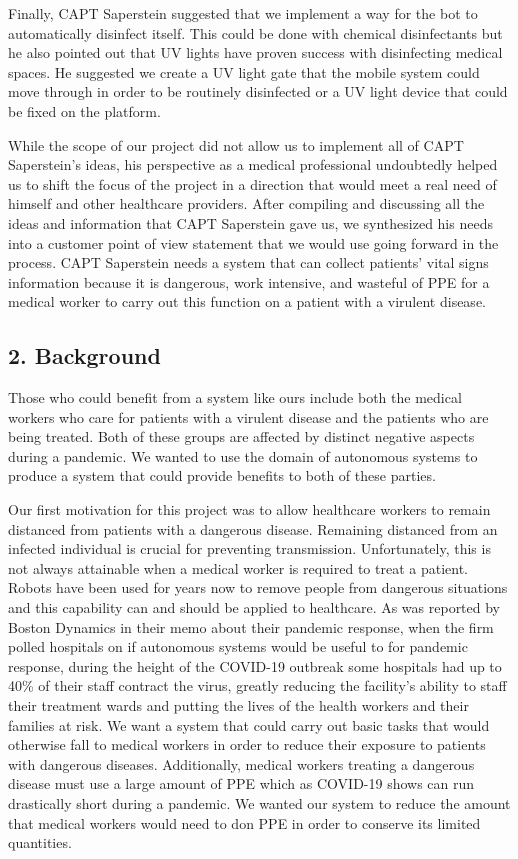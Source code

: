 ﻿\documentclass[10pt]{article}
\begin{document}
Finally, CAPT Saperstein suggested that we implement a way for the bot to automatically disinfect itself. This could be done with chemical disinfectants but he also pointed out that UV lights have proven success with disinfecting medical spaces. He suggested we create a UV light gate that the mobile system could move through in order to be routinely disinfected or a UV light device that could be fixed on the platform. 

While the scope of our project did not allow us to implement all of CAPT Saperstein’s ideas, his perspective as a medical professional undoubtedly helped us to shift the focus of the project in a direction that would meet a real need of himself and other healthcare providers. After compiling and discussing all the ideas and information that CAPT Saperstein gave us, we synthesized his needs into a customer point of view statement that we would use going forward in the process.
CAPT Saperstein needs a system that can collect patients’ vital signs information because it is dangerous, work intensive, and wasteful of PPE for a medical worker to carry out this function on a patient with a virulent disease. 

\subsection{2. Background}
Those who could benefit from a system like ours include both the medical workers who care for patients with a virulent disease and the patients who are being treated. Both of these groups are affected by distinct negative aspects during a pandemic. We wanted to use the domain of autonomous systems to produce a system that could provide benefits to both of these parties. 

Our first motivation for this project was to allow healthcare workers to remain distanced from patients with a dangerous disease. Remaining distanced from an infected individual is crucial for preventing transmission. Unfortunately, this is not always attainable when a medical worker is required to treat a patient. Robots have been used for years now to remove people from dangerous situations and this capability can and should be applied to healthcare. As was reported by Boston Dynamics in their memo about their pandemic response, when the firm polled hospitals on if autonomous systems would be useful to for pandemic response, during the height of the COVID-19 outbreak some hospitals had up to 40\% of their staff contract the virus, greatly reducing the facility’s ability to staff their treatment wards and putting the lives of the health workers and their families at risk. We want a system that could carry out basic tasks that would otherwise fall to medical workers in order to reduce their exposure to patients with dangerous diseases. Additionally, medical workers treating a dangerous disease must use a large amount of PPE which as COVID-19 shows can run drastically short during a pandemic. We wanted our system to reduce the amount that medical workers would need to don PPE in order to conserve its limited quantities. 
\end{document}
